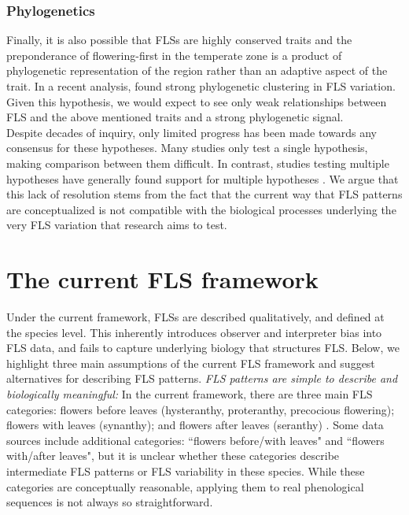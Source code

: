 \documentclass{article}
\begin{document}
\subsubsection*{Phylogenetics} 
\noindent Finally, it is also possible that FLSs are highly conserved traits and the preponderance of flowering-first in the temperate zone is a product of phylogenetic representation of the region rather than an adaptive aspect of the trait. In a recent analysis, \citet{Gougherty2018} found strong phylogenetic clustering in FLS variation. Given this hypothesis, we would expect to see only weak relationships between FLS and the above mentioned traits and a strong phylogenetic signal.\\

\noindent Despite decades of inquiry, only limited progress has been made towards any consensus for these hypotheses. Many studies only test a single hypothesis, making comparison between them difficult. In contrast, studies testing multiple hypotheses have generally found support for multiple hypotheses \citep[see][]{Bolmgren2003,Gougherty2018}. We argue that this lack of resolution stems from the fact that the current way that FLS patterns are conceptualized is not compatible with the biological processes underlying the very FLS variation that research aims to test.

\section*{The current FLS framework}
Under the current framework, FLSs are described qualitatively, and defined at the species level. This inherently introduces observer and interpreter bias into FLS data, and fails to capture underlying biology that structures FLS. Below, we highlight three main assumptions of the current FLS framework and suggest alternatives for describing FLS patterns. %
\emph{FLS patterns are simple to describe and biologically meaningful:} %
In the current framework, there are three main FLS categories: flowers before leaves (hysteranthy, proteranthy, precocious flowering); flowers with leaves (synanthy); and flowers after leaves (seranthy) \citep{Lamont2011, Heinig1899}. Some data sources \citep[e.g.][]{Burns1990,Barnes2004} include additional categories: ``flowers before/with leaves" and ``flowers with/after leaves", but it is unclear whether these categories describe intermediate FLS patterns or FLS variability in these species. While these categories are conceptually reasonable, applying them to real phenological sequences is not always so straightforward.\\
\end{document}
